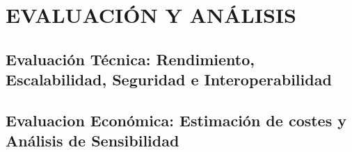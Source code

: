 \chapter{EVALUACIÓN Y ANÁLISIS}\label{ch:evaluacion}

\section{Evaluación Técnica: Rendimiento, Escalabilidad, Seguridad e Interoperabilidad}\label{sec:evaluacion-tecnica}

\section{Evaluacion Económica: Estimación de costes y Análisis de Sensibilidad}\label{sec:evaluacion-economica}

